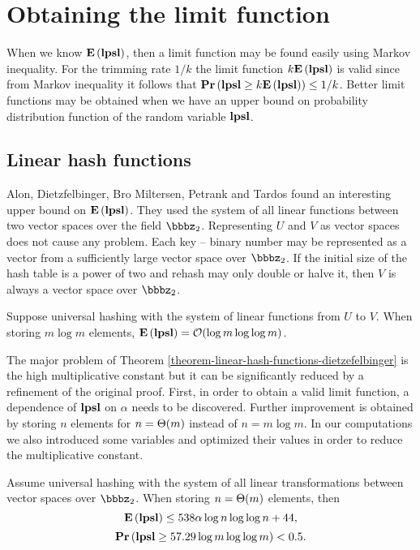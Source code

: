 \section{Obtaining the limit function}
\label{section-limit}

When we know $\mathbf{E}\left(\mathbf{lpsl}\right)$, then a limit function may be found easily using Markov inequality. For the trimming rate $1/k$ the limit function $k \mathbf{E}\left(\mathbf{lpsl}\right)$ is valid since from Markov inequality it follows that $\mathbf{Pr}\left(\mathbf{lpsl} \geq k \mathbf{E}\left(\mathbf{lpsl}\right)\right) \leq {1}/{k}$. Better limit functions may be obtained when we have an upper bound on probability distribution function of the random variable $\mathbf{lpsl}$.

\subsection{Linear hash functions}
Alon, Dietzfelbinger, Bro Miltersen, Petrank and Tardos \cite{DBLP:journals/jacm/AlonDMPT99} found an interesting upper bound on $\mathbf{E}\left(\mathbf{lpsl}\right)$. They used the system of all linear functions between two vector spaces over the field $\bbbz_2$. Representing $U$ and $V$ as vector spaces does not cause any problem. Each key -- binary number may be represented as a vector from a sufficiently large vector space over $\bbbz_2$. If the initial size of the hash table is a power of two and rehash may only double or halve it, then $V$ is always a vector space over $\bbbz_2$.

\begin{theorem}
\label{theorem-linear-hash-functions-dietzefelbinger}
Suppose universal hashing with the system of linear functions from $U$ to $V$. When storing $m \log m$ elements, $\mathbf{E}\left(\mathbf{lpsl}\right) = \mathcal{O}(\log m \log \log m)$. 
\end{theorem}

The major problem of Theorem \ref{theorem-linear-hash-functions-dietzefelbinger} is the high multiplicative constant but it can be significantly reduced by a refinement of the original proof. First, in order to obtain a valid limit function, a dependence of $\mathbf{lpsl}$ on $\alpha$ needs to be discovered. Further improvement is obtained by storing $n$ elements for $n = \mathrm{\Theta}(m)$ instead of $n = m \log m$. In our computations we also introduced some variables and optimized their values in order to reduce the multiplicative constant.

\begin{theorem}
\label{theorem-linear-refined}
Assume universal hashing with the system of all linear transformations between vector spaces over $\bbbz_2$. When storing $n = \mathrm{\Theta}(m)$ elements, then $$\mathbf{E}\left(\mathbf{lpsl}\right) \leq 538 \alpha \log n \log \log n + 44,$$ $$\mathbf{Pr}\left(\mathbf{lpsl} \geq 57.29 \log m \log \log m\right) < 0.5.$$
\end{theorem}

